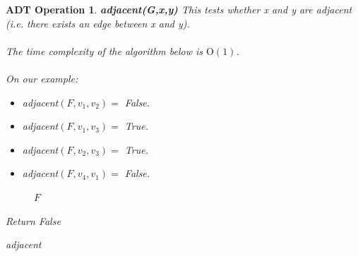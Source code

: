 \documentclass[11pt,reqno]{amsart}
\newtheorem{oper}[thm]{ADT Operation}
\theoremstyle{definition}
\numberwithin{equation}{section}
\begin{document}
\newpage
\begin{oper}
	\textbf{adjacent(G,x,y)}
	This tests whether x and y are adjacent (i.e. there exists an edge between x and y). \\
	\\
	The time complexity of the algorithm below is $\mathrm{O}(1)$.\\
	\\
	On our example:
	\begin{itemize}
		\item adjacent$(F,v_1,v_2) = $ False.
		\item adjacent$(F,v_1,v_3) = $ True.
		\item adjacent$(F,v_2,v_3) = $ True.
		\item adjacent$(F,v_4,v_1) = $ False.
	\end{itemize}

	\begin{figure}[h!]
	\caption{$F$}
	\label{fig:ForestDupe1}
\end{figure}

\pagebreak
\begin{algorithm}[H]
	\SetAlgoLined
	Return False
	\caption{adjacent}
\end{algorithm}
\end{oper}
\end{document}
